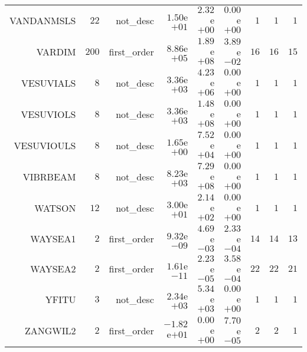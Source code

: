 \begin{longtable}{rrrrrrrrr}
VANDANMSLS & \(    22\) & not\_desc & \( 1.50\)e\(+01\) & \( 2.32\)e\(+00\) & \( 0.00\)e\(+00\) & \(     1\) & \(     1\) & \(     1\) \\
VARDIM & \(   200\) & first\_order & \( 8.86\)e\(+05\) & \( 1.89\)e\(+08\) & \( 3.89\)e\(-02\) & \(    16\) & \(    16\) & \(    15\) \\
VESUVIALS & \(     8\) & not\_desc & \( 3.36\)e\(+03\) & \( 4.23\)e\(+06\) & \( 0.00\)e\(+00\) & \(     1\) & \(     1\) & \(     1\) \\
VESUVIOLS & \(     8\) & not\_desc & \( 3.36\)e\(+03\) & \( 1.48\)e\(+08\) & \( 0.00\)e\(+00\) & \(     1\) & \(     1\) & \(     1\) \\
VESUVIOULS & \(     8\) & not\_desc & \( 1.65\)e\(+00\) & \( 7.52\)e\(+04\) & \( 0.00\)e\(+00\) & \(     1\) & \(     1\) & \(     1\) \\
VIBRBEAM & \(     8\) & not\_desc & \( 8.23\)e\(+03\) & \( 7.29\)e\(+08\) & \( 0.00\)e\(+00\) & \(     1\) & \(     1\) & \(     1\) \\
WATSON & \(    12\) & not\_desc & \( 3.00\)e\(+01\) & \( 2.14\)e\(+02\) & \( 0.00\)e\(+00\) & \(     1\) & \(     1\) & \(     1\) \\
WAYSEA1 & \(     2\) & first\_order & \( 9.32\)e\(-09\) & \( 4.69\)e\(-03\) & \( 2.33\)e\(-04\) & \(    14\) & \(    14\) & \(    13\) \\
WAYSEA2 & \(     2\) & first\_order & \( 1.61\)e\(-11\) & \( 2.23\)e\(-05\) & \( 3.58\)e\(-04\) & \(    22\) & \(    22\) & \(    21\) \\
YFITU & \(     3\) & not\_desc & \( 2.34\)e\(+03\) & \( 5.34\)e\(+03\) & \( 0.00\)e\(+00\) & \(     1\) & \(     1\) & \(     1\) \\
ZANGWIL2 & \(     2\) & first\_order & \(-1.82\)e\(+01\) & \( 0.00\)e\(+00\) & \( 7.70\)e\(-05\) & \(     2\) & \(     2\) & \(     1\) \\\hline
\end{longtable}
